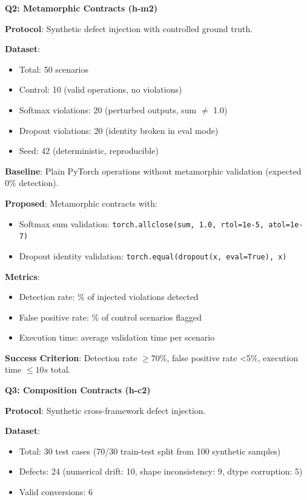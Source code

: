\textbf{Q2: Metamorphic Contracts (h-m2)}

\textbf{Protocol}: Synthetic defect injection with controlled ground truth.

\textbf{Dataset}:
\begin{itemize}
\item Total: 50 scenarios
\item Control: 10 (valid operations, no violations)
\item Softmax violations: 20 (perturbed outputs, sum $\neq$ 1.0)
\item Dropout violations: 20 (identity broken in eval mode)
\item Seed: 42 (deterministic, reproducible)
\end{itemize}

\textbf{Baseline}: Plain PyTorch operations without metamorphic validation (expected 0\% detection).

\textbf{Proposed}: Metamorphic contracts with:
\begin{itemize}
\item Softmax sum validation: \texttt{torch.allclose(sum, 1.0, rtol=1e-5, atol=1e-7)}
\item Dropout identity validation: \texttt{torch.equal(dropout(x, eval=True), x)}
\end{itemize}

\textbf{Metrics}:
\begin{itemize}
\item Detection rate: \% of injected violations detected
\item False positive rate: \% of control scenarios flagged
\item Execution time: average validation time per scenario
\end{itemize}

\textbf{Success Criterion}: Detection rate $\geq 70$\%, false positive rate <5\%, execution time $\leq 10s$ total.

\textbf{Q3: Composition Contracts (h-c2)}

\textbf{Protocol}: Synthetic cross-framework defect injection.

\textbf{Dataset}:
\begin{itemize}
\item Total: 30 test cases (70/30 train-test split from 100 synthetic samples)
\item Defects: 24 (numerical drift: 10, shape inconsistency: 9, dtype corruption: 5)
\item Valid conversions: 6
\end{itemize}

